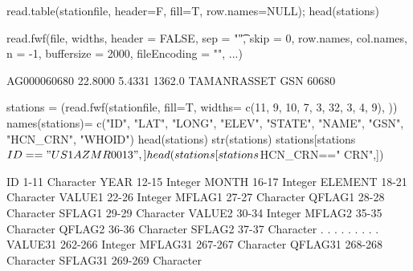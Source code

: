 \documentclass{article}\usepackage[]{graphicx}\usepackage[]{color}
\begin{document}
read.table(stationfile, header=F, fill=T, row.names=NULL); head(stations)

read.fwf(file, widths, header = FALSE, sep = "\t",
         skip = 0, row.names, col.names, n = -1,
         buffersize = 2000, fileEncoding = "", ...)
         
AG000060680  22.8000    5.4331 1362.0    TAMANRASSET                    GSN     60680        
         
stations = (read.fwf(stationfile, fill=T, widths= c(11, 9, 10, 7, 3, 32, 3, 4, 9), ))
names(stations)= c("ID", "LAT", "LONG", "ELEV", "STATE", "NAME", "GSN", "HCN_CRN", "WHOID")
head(stations)
str(stations)
stations[stations$ID=="US1AZMR0013",]
head(stations[stations$HCN_CRN==" CRN",])



ID            1-11   Character
YEAR         12-15   Integer
MONTH        16-17   Integer
ELEMENT      18-21   Character
VALUE1       22-26   Integer
MFLAG1       27-27   Character
QFLAG1       28-28   Character
SFLAG1       29-29   Character
VALUE2       30-34   Integer
MFLAG2       35-35   Character
QFLAG2       36-36   Character
SFLAG2       37-37   Character
  .           .          .
  .           .          .
  .           .          .
VALUE31    262-266   Integer
MFLAG31    267-267   Character
QFLAG31    268-268   Character
SFLAG31    269-269   Character
\end{document}
